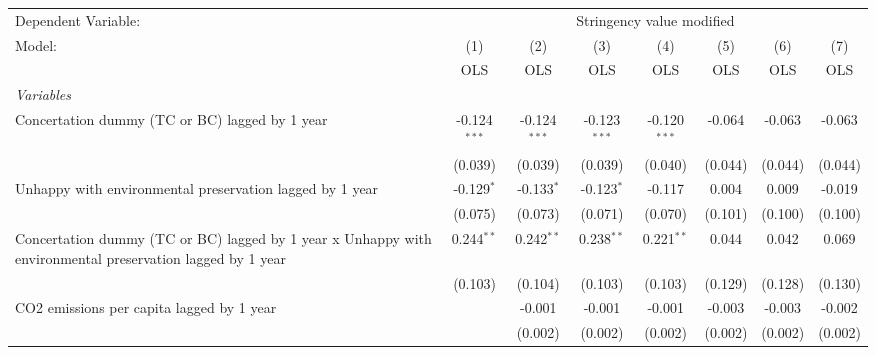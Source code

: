 
\begingroup
\centering
\begin{tabular}{lccccccc}
   \toprule
   Dependent Variable: & \multicolumn{7}{c}{Stringency value modified}\\
   Model:                                                                                                    & (1)            & (2)            & (3)            & (4)            & (5)     & (6)     & (7)\\  
                                                                                                             &  OLS           & OLS            & OLS            & OLS            & OLS     & OLS     & OLS\\  
   \midrule
   \emph{Variables}\\
   Concertation dummy (TC or BC) lagged by 1 year                                                            & -0.124$^{***}$ & -0.124$^{***}$ & -0.123$^{***}$ & -0.120$^{***}$ & -0.064  & -0.063  & -0.063\\   
                                                                                                             & (0.039)        & (0.039)        & (0.039)        & (0.040)        & (0.044) & (0.044) & (0.044)\\   
   Unhappy with environmental preservation lagged by 1 year                                                  & -0.129$^{*}$   & -0.133$^{*}$   & -0.123$^{*}$   & -0.117         & 0.004   & 0.009   & -0.019\\   
                                                                                                             & (0.075)        & (0.073)        & (0.071)        & (0.070)        & (0.101) & (0.100) & (0.100)\\   
   Concertation dummy (TC or BC) lagged by 1 year x Unhappy with environmental preservation lagged by 1 year & 0.244$^{**}$   & 0.242$^{**}$   & 0.238$^{**}$   & 0.221$^{**}$   & 0.044   & 0.042   & 0.069\\   
                                                                                                             & (0.103)        & (0.104)        & (0.103)        & (0.103)        & (0.129) & (0.128) & (0.130)\\   
   CO2 emissions per capita lagged by 1 year                                                                 &                & -0.001         & -0.001         & -0.001         & -0.003  & -0.003  & -0.002\\   
                                                                                                             &                & (0.002)        & (0.002)        & (0.002)        & (0.002) & (0.002) & (0.002)\\   

\end{tabular}
